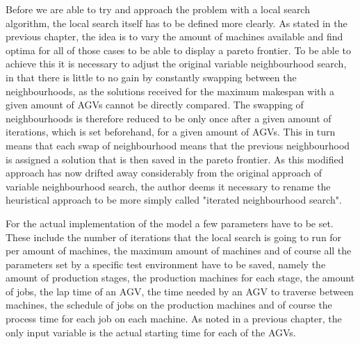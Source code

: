 Before we are able to try and approach the problem with a local search algorithm, the local search itself has to be defined more clearly. As stated
in the previous chapter, the idea is to vary the amount of machines available and find optima for all of those cases to be able to display a pareto
frontier. To be able to achieve this it is necessary to adjust the original variable neighbourhood search, in that there is little to no gain by
constantly swapping between the neighbourhoods, as the solutions received for the maximum makespan with a given amount of AGVs cannot be directly
compared. The swapping of neighbourhoods is therefore reduced to be only once after a given amount of iterations, which is set beforehand, for a
given amount of AGVs. This in turn means that each swap of neighbourhood means that the previous neighbourhood is assigned a solution that is then
saved in the pareto frontier. As this modified approach has now drifted away considerably from the original approach of variable neighbourhood search,
the author deems it necessary to rename the heuristical approach to be more simply called "iterated neighbourhood search".

For the actual implementation of the model a few parameters have to be set. These include the number of iterations that the local search is going
to run for per amount of machines, the maximum amount of machines and of course all the parameters set by a specific test environment have to be
saved, namely the amount of production stages, the production machines for each stage, the amount of jobs, the lap time of an AGV, the time needed 
by an AGV to traverse between machines, the schedule of jobs on the production machines and of course the process time for each job on each machine.
As noted in a previous chapter, the only input variable is the actual starting time for each of the AGVs.

